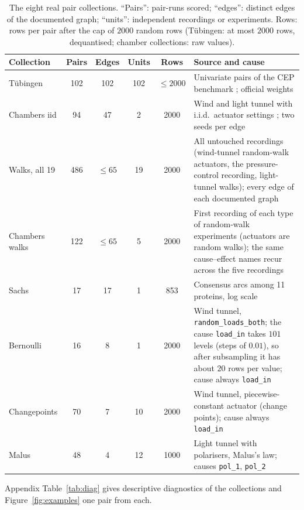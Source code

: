 \begin{table}[t]
\caption{The eight real pair collections. ``Pairs'': pair-runs scored; ``edges'': distinct edges of the documented graph; ``units'': independent recordings or experiments. Rows: rows per pair after the cap of $2000$ random rows (T\"ubingen: at most $2000$ rows, dequantised; chamber collections: raw values).}
\label{tab:collections}
\small
\begin{tabular}{@{}lccccp{5.6cm}@{}}
\toprule
Collection & Pairs & Edges & Units & Rows & Source and cause\\
\midrule
T\"ubingen & 102 & 102 & 102 & $\le 2000$ & Univariate pairs of the CEP benchmark \citep{mooij2016distinguishing}; official weights\\
Chambers iid & 94 & 47 & 2 & 2000 & Wind and light tunnel with i.i.d.\ actuator settings \citep{gamella2025chamber}; two seeds per edge\\
Walks, all 19 & 486 & $\le65$ & 19 & 2000 & All untouched recordings (wind-tunnel random-walk actuators, the pressure-control recording, light-tunnel walks); every edge of each documented graph\\
Chambers walks & 122 & $\le65$ & 5 & 2000 & First recording of each type of random-walk experiments (actuators are random walks); the same cause--effect names recur across the five recordings\\
Sachs & 17 & 17 & 1 & 853 & Consensus arcs among 11 proteins, log scale \citep{sachs2005causal}\\
Bernoulli & 16 & 8 & 1 & 2000 & Wind tunnel, \texttt{random\_loads\_both}; the cause \texttt{load\_in} takes $101$ levels (steps of $0.01$), so after subsampling it has about $20$ rows per value; cause always \texttt{load\_in}\\
Changepoints & 70 & 7 & 10 & 2000 & Wind tunnel, piecewise-constant actuator (change points); cause always \texttt{load\_in}\\
Malus & 48 & 4 & 12 & 1000 & Light tunnel with polarisers, Malus's law; causes \texttt{pol\_1}, \texttt{pol\_2}\\
\bottomrule
\end{tabular}
\end{table}

Appendix Table~\ref{tab:diag} gives descriptive diagnostics of the collections and Figure~\ref{fig:examples} one pair from each.

